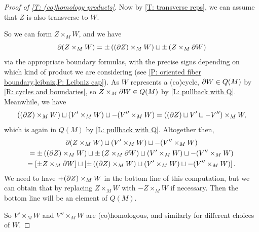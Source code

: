 \begin{proof}[Proof of \cref{T: (co)homology products}]
	Now by \cref{T: transverse reps}, we can assume that $Z$ is also transverse to $W$.

	So we can form $Z \times_M W$, and we have $$\partial (Z \times_M W) = \pm \left( (\partial Z) \times_M W \right) \sqcup \pm \left( Z \times_M \partial W \right)$$ via the appropriate boundary formulas, with the precise signs depending on which kind of product we are considering (see \cref{P: oriented fiber boundary,leibniz,P: Leibniz cap}).
	As $W$ represents a (co)cycle, $\partial W \in Q(M)$ by \cref{R: cycles and boundaries}, so $Z \times_M \partial W \in Q(M)$ by \cref{L: pullback with Q}.
	Meanwhile, we have
	$$((\partial Z) \times_M W) \sqcup (V' \times_M W) \sqcup -(V'' \times_M W) = \left((\partial Z) \sqcup V' \sqcup -V''\right) \times_M W,$$
	which is again in $Q(M)$ by \cref{L: pullback with Q}.
	Altogether then,
	\begin{multline*}
	\partial (Z \times_M W)  \sqcup (V' \times_M W) \sqcup -(V'' \times_M W)\\
	  = \pm \left( (\partial Z) \times_M W \right) \sqcup \pm \left( Z \times_M \partial W \right) \sqcup (V' \times_M W) \sqcup -(V'' \times_M W)\\
	 = \left[\pm Z \times_M \partial W\right] \sqcup \left[ \pm \left((\partial Z) \times_M W \right) \sqcup (V' \times_M W) \sqcup -(V'' \times_M W)\right].
	\end{multline*}
	We need to have $+(\partial Z) \times_M W$ in the bottom line of this computation, but we can obtain that by replacing $Z \times_M W$ with $-Z \times_M W$ if necessary.
	Then the bottom line will be an element of $Q(M)$.

	So $V' \times_M W$ and $V'' \times_M W$ are (co)homologous, and similarly for different choices of $W$.
	\qedhere

\end{proof}

